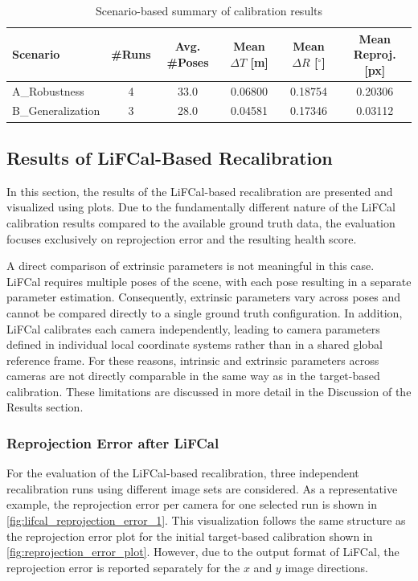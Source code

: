 \documentclass[12pt]{scrartcl}
\begin{document}
\begin{table}[htbp]
\centering
\small
\begin{tabular}{lccccc}
\hline
Scenario & \#Runs & Avg. \#Poses & Mean $\Delta T$ [m] & Mean $\Delta R$ [$^\circ$] & Mean Reproj. [px] \\
\hline
A\_Robustness & 4 & 33.0 & 0.06800 & 0.18754 & 0.20306 \\
B\_Generalization & 3 & 28.0 & 0.04581 & 0.17346 & 0.03112 \\
\hline
\end{tabular}
\caption{Scenario-based summary of calibration results}
\label{tab:scenario_summary}
\end{table}


\subsection{Results of LiFCal-Based Recalibration}

In this section, the results of the LiFCal-based recalibration are presented and visualized using plots. Due to the fundamentally different nature of the LiFCal calibration results compared to the available ground truth data, the evaluation focuses exclusively on reprojection error and the resulting health score.
\newline

A direct comparison of extrinsic parameters is not meaningful in this case. LiFCal requires multiple poses of the scene, with each pose resulting in a separate parameter estimation. Consequently, extrinsic parameters vary across poses and cannot be compared directly to a single ground truth configuration. In addition, LiFCal calibrates each camera independently, leading to camera parameters defined in individual local coordinate systems rather than in a shared global reference frame. For these reasons, intrinsic and extrinsic parameters across cameras are not directly comparable in the same way as in the target-based calibration. These limitations are discussed in more detail in the Discussion of the Results section.

\subsubsection{Reprojection Error after LiFCal}

For the evaluation of the LiFCal-based recalibration, three independent recalibration runs using different image sets are considered. As a representative example, the reprojection error per camera for one selected run is shown in \autoref{fig:lifcal_reprojection_error_1}. This visualization follows the same structure as the reprojection error plot for the initial target-based calibration shown in \autoref{fig:reprojection_error_plot}. However, due to the output format of LiFCal, the reprojection error is reported separately for the $x$ and $y$ image directions.
\end{document}
